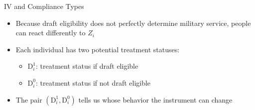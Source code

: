 \documentclass[dvipsnames,hyperref={pdfpagelabels=false}]{beamer}
\begin{document}
\begin{frame}{IV and Compliance Types}
	\begin{itemize}
		\item Because draft eligibility does not perfectly determine military service, people can react differently to $Z_i$
		\vspace{0.2cm}
		\item Each individual has two potential treatment statuses:
		\vspace{0.2cm}
		\begin{itemize}
			\item $\mathrm{D}^{1}_{i}$: treatment status if draft eligible
			\vspace{0.2cm}
			\item $\mathrm{D}^{0}_{i}$: treatment status if not draft eligible
		\end{itemize}
		\vspace{0.2cm}
		\item The pair $(\mathrm{D}^{1}_{i},\mathrm{D}^{0}_{i})$ tells us whose behavior the instrument can change
		
	\end{itemize}
\end{frame}
\end{document}
